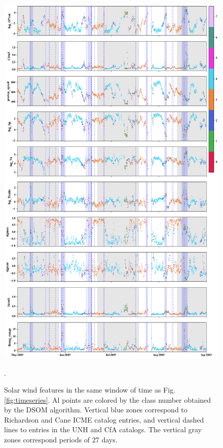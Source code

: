 \documentclass[utf8]{frontiersSCNS} %
\begin{document}
\begin{figure}[h!]
	\begin{center}
		\includegraphics[width=18cm]{Amaya/tsfeatures-som}%
	\end{center}
	\caption{Solar wind features in the same window of time as Fig.\ref{fig:timeseries}. Al points are colored by the class number obtained by the DSOM algorithm. Vertical blue zones correspond to Richardson and Cane ICME catalog entries, and vertical dashed lines to entries in the UNH and CfA catalogs. The vertical gray zones correspond periods of 27 days.}\label{fig:tsfeatures-som}.
\end{figure}
\end{document}

